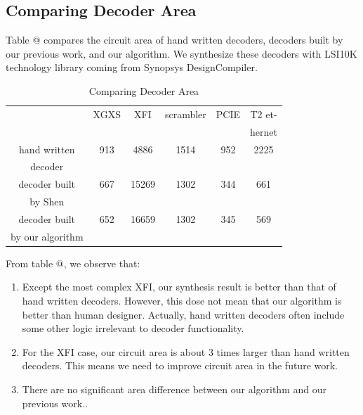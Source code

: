 \documentclass[journal]{IEEEtran}
\makeatletter
\newcommand{\Rmnum}[1]{\expandafter\@slowromancap\romannumeral #1@}
\makeatother
\begin{document}
\subsection{Comparing Decoder Area}

Table \Rmnum{4} compares the circuit area of hand written decoders,
decoders built by our previous work\cite{ShegnYuShen:iccad09},
and our algorithm.
We synthesize these decoders with LSI10K technology library coming from Synopsys DesignCompiler.

\begin{table}[!t]
\centering
\caption{Comparing Decoder Area}
\begin{tabular}{|c|c|c|c|c|c|}
\hline
&XGXS&XFI&scrambler&PCIE&T2 et-\\
&&&&&hernet\\ \hline
hand written      &913       &4886     &1514         &952   &2225          \\
decoder          &&&&&\\ \hline
decoder built     &667       &15269     &1302         &344   &661          \\
by Shen\cite{ShegnYuShen:iccad09}   &&&&&\\ \hline
decoder built     &652       &16659     &1302         &345   &569          \\
by our algorithm   &&&&&\\ \hline
\end{tabular}
\end{table}

From table \Rmnum{4},
we observe that:
\begin{enumerate}
\item Except the most complex XFI,
our synthesis result is better than that of hand written decoders.
However,
this dose not mean that our algorithm is better than human designer.
Actually,
hand written decoders often include some other logic irrelevant to decoder functionality.
\item For the XFI case,
our circuit area is about 3 times larger than hand written decoders.
This means we need to improve circuit area in the future work.
\item There are no significant area difference between our algorithm and our previous work.\cite{ShegnYuShen:iccad09}.
\end{enumerate}
\end{document}
